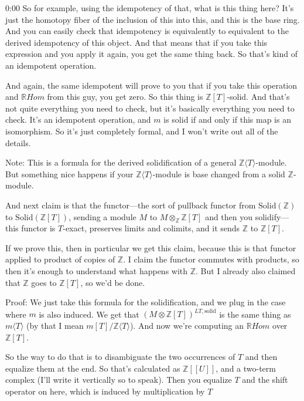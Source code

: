 \begin{unfinished}{0:00}
So for example, using the idempotency of that, what is this thing here? It's just the homotopy fiber of the inclusion of this into this, and this is the base ring. And you can easily check that idempotency is equivalently to equivalent to the derived idempotency of this object. And that means that if you take this expression and you apply it again, you get the same thing back. So that's kind of an idempotent operation.

And again, the same idempotent will prove to you that if you take this operation and $\mathbb{R}Hom$ from this guy, you get zero. So this thing is $\mathbb{Z}[T]$-solid. And that's not quite everything you need to check, but it's basically everything you need to check. It's an idempotent operation, and $m$ is solid if and only if this map is an isomorphism. So it's just completely formal, and I won't write out all of the details.

Note: This is a formula for the derived solidification of a general $\mathbb{Z}\langle T \rangle$-module. But something nice happens if your $\mathbb{Z}\langle T \rangle$-module is base changed from a solid $\mathbb{Z}$-module.

And next claim is that the functor---the sort of pullback functor from $\mathrm{Solid}(\mathbb{Z})$ to $\mathrm{Solid}(\mathbb{Z}[T])$, sending a module $M$ to $M\otimes_{\mathbb{Z}}\mathbb{Z}[T]$ and then you solidify---this functor is $T$-exact, preserves limits and colimits, and it sends $\mathbb{Z}$ to $\mathbb{Z}[T]$.

If we prove this, then in particular we get this claim, because this is that functor applied to product of copies of $\mathbb{Z}$. I claim the functor commutes with products, so then it's enough to understand what happens with $\mathbb{Z}$. But I already also claimed that $\mathbb{Z}$ goes to $\mathbb{Z}[T]$, so we'd be done.

Proof: We just take this formula for the solidification, and we plug in the case where $m$ is also induced. We get that $(M\otimes \mathbb{Z}[T])^{LT,\mathrm{solid}}$ is the same thing as $m\langle T\rangle$ (by that I mean $m[T]/\mathbb{Z}\langle T\rangle$). And now we're computing an $\mathbb{R}Hom$ over $\mathbb{Z}[T]$.

So the way to do that is to disambiguate the two occurrences of $T$ and then equalize them at the end. So that's calculated as $\mathbb{Z}[[U]]$, and a two-term complex (I'll write it vertically so to speak). Then you equalize $T$ and the shift operator on here, which is induced by multiplication by $T$


\end{unfinished}
